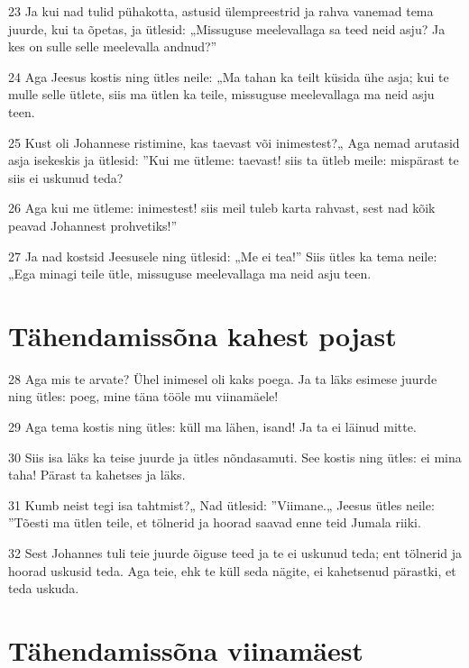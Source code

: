 \par 23 Ja kui nad tulid pühakotta, astusid ülempreestrid ja rahva vanemad tema juurde, kui ta õpetas, ja ütlesid: „Missuguse meelevallaga sa teed neid asju? Ja kes on sulle selle meelevalla andnud?”
\par 24 Aga Jeesus kostis ning ütles neile: „Ma tahan ka teilt küsida ühe asja; kui te mulle selle ütlete, siis ma ütlen ka teile, missuguse meelevallaga ma neid asju teen.
\par 25 Kust oli Johannese ristimine, kas taevast või inimestest?„ Aga nemad arutasid asja isekeskis ja ütlesid: ”Kui me ütleme: taevast! siis ta ütleb meile: mispärast te siis ei uskunud teda?
\par 26 Aga kui me ütleme: inimestest! siis meil tuleb karta rahvast, sest nad kõik peavad Johannest prohvetiks!”
\par 27 Ja nad kostsid Jeesusele ning ütlesid: „Me ei tea!” Siis ütles ka tema neile: „Ega minagi teile ütle, missuguse meelevallaga ma neid asju teen.

\section*{Tähendamissõna kahest pojast}

\par 28 Aga mis te arvate? Ühel inimesel oli kaks poega. Ja ta läks esimese juurde ning ütles: poeg, mine täna tööle mu viinamäele!
\par 29 Aga tema kostis ning ütles: küll ma lähen, isand! Ja ta ei läinud mitte.
\par 30 Siis isa läks ka teise juurde ja ütles nõndasamuti. See kostis ning ütles: ei mina taha! Pärast ta kahetses ja läks.
\par 31 Kumb neist tegi isa tahtmist?„ Nad ütlesid: ”Viimane.„ Jeesus ütles neile: ”Tõesti ma ütlen teile, et tölnerid ja hoorad saavad enne teid Jumala riiki.
\par 32 Sest Johannes tuli teie juurde õiguse teed ja te ei uskunud teda; ent tölnerid ja hoorad uskusid teda. Aga teie, ehk te küll seda nägite, ei kahetsenud pärastki, et teda uskuda.

\section*{Tähendamissõna viinamäest}


